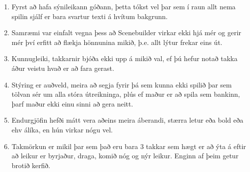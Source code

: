 \documentclass{article}
\begin{document}
\begin{enumerate}
    \item Fyrst að hafa sýnileikann góðann, þetta tókst vel þar sem í raun allt nema spilin sjálf er bara svartur texti á hvítum bakgrunn.
    \item Samræmi var einfalt vegna þess að Scenebuilder virkar ekki hjá mér og gerir mér því erfitt að flækja hönnunina mikið, þ.e. allt lýtur frekar eins út.
    \item Kunnugleiki, takkarnir bjóða ekki upp á mikið val, ef þú hefur notað takka áður veistu hvað er að fara gerast.
    \item Stýring er auðveld, meira að segja fyrir þá sem kunna ekki spilið þar sem tölvan sér um alla stóra útreikninga, plús ef maður er að spila sem bankinn, þarf maður ekki einu sinni að gera neitt.
    \item Endurgjöfin hefði mátt vera aðeins meira áberandi, stærra letur eða bold eða ehv álíka, en hún virkar nógu vel.
    \item Takmörkun er mikil þar sem það eru bara 3 takkar sem hægt er að ýta á eftir að leikur er byrjaður, draga, komið nóg og nýr leikur. Enginn af þeim getur brotið kerfið.
\end{enumerate}

\newpage
\end{document}
